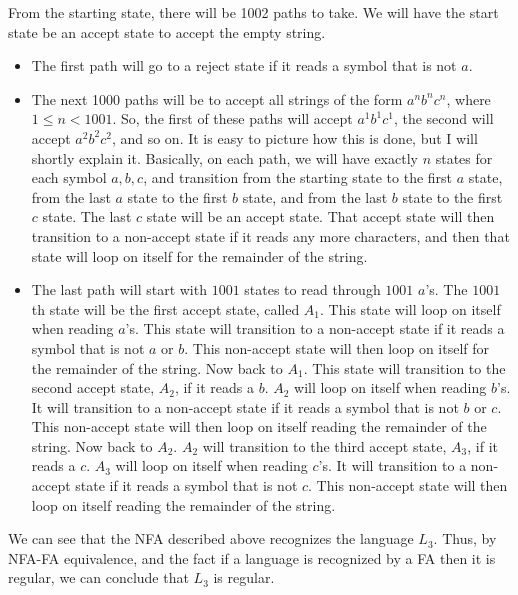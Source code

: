 \documentclass{article}
\begin{document}
\begin{description}
        From the starting state, there will be 1002 paths to take. We will
        have the start state be an accept state to accept the empty string.
        \begin{itemize}
            \item The first path will go to a reject state if it reads a symbol
            that is not $a$.
            \item The next 1000 paths will be to accept all strings of the form
            $a^{n}b^{n}c^{n}$, where $1 \le n < 1001$. So, the first of these
            paths will accept $a^{1}b^{1}c^{1}$, the second will accept
            $a^{2}b^{2}c^{2}$, and so on. It is easy to picture how this is
            done, but I will shortly explain it. Basically, on each path,
            we will have exactly $n$ states for each symbol $a,b,c$, and
            transition from the starting state to the first $a$ state,
            from the last $a$ state to the first $b$ state, and from
            the last $b$ state to the first $c$ state. The last $c$
            state will be an accept state. That accept state will then
            transition to
            a non-accept state if it reads any more characters, and then
            that state will loop on itself for the remainder of the string.
            \item The last path will start with $1001$ states to read through
            $1001$ $a$'s. The $1001$th state will be the first accept state,
            called $A_{1}$.
            This state will loop on itself when reading $a$'s. This state will
            transition to a non-accept state if it reads a symbol
            that is not $a$ or $b$. This non-accept state will then loop on
            itself for the remainder of the string. Now back to $A_{1}$.
            This state will transition to the second accept state,
            $A_{2}$, if it reads a $b$. $A_{2}$ will loop on itself
            when reading $b$'s. It will transition to
            a non-accept state if it reads a symbol that is not $b$ or $c$.
            This non-accept state will then loop on itself reading the remainder
            of the string. Now back to $A_{2}$. $A_{2}$ will transition
            to the third accept state, $A_{3}$, if it reads a $c$. $A_{3}$
            will loop on itself when reading $c$'s. It will transition to
            a non-accept state if it reads a symbol that is not $c$. This
            non-accept state will then loop on itself reading the remainder
            of the string.
        \end{itemize}
        We can see that the NFA described above recognizes the language
        $L_{3}$. Thus, by NFA-FA equivalence, and the fact if a language
        is recognized by a FA then it is regular, we can conclude that
        $L_{3}$ is regular.

\end{description}
\newpage
\end{document}
